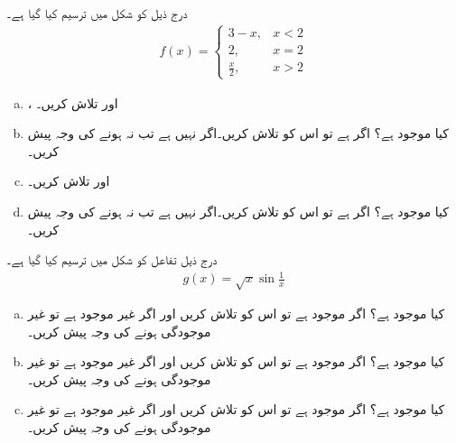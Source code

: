 درج ذیل کو شکل  میں ترسیم کیا گیا ہے۔
\begin{align*}
f(x)=\begin{cases}
3-x,&x<2\\
2,&x=2\\
\frac{x}{2},&x>2
\end{cases}
\end{align*}
%
\begin{enumerate}[a.]
\item
{}،  اور  تلاش کریں۔
\item
کیا  موجود ہے؟ اگر ہے تو اس کو تلاش کریں۔اگر نہیں ہے تب نہ ہونے کی وجہ پیش کریں۔
\item
{} اور  تلاش کریں۔
\item
کیا  موجود ہے؟ اگر ہے تو اس کو تلاش کریں۔اگر نہیں ہے تب نہ ہونے کی وجہ پیش کریں۔
\end{enumerate}
درج ذیل تفاعل کو شکل  میں ترسیم کیا گیا ہے۔
\begin{align*}
g(x)=\sqrt{x}\sin\frac{1}{x}
\end{align*}
%
\begin{enumerate}[a.]
\item
کیا  موجود ہے؟ اگر موجود ہے تو اس کو تلاش کریں اور اگر غیر موجود ہے تو غیر موجودگی ہونے کی وجہ پیش کریں۔
\item
کیا  موجود ہے؟ اگر موجود ہے تو اس کو تلاش کریں اور اگر غیر موجود ہے تو غیر موجودگی ہونے کی وجہ پیش کریں۔
\item
کیا  موجود ہے؟ اگر موجود ہے تو اس کو تلاش کریں اور اگر غیر موجود ہے تو غیر موجودگی ہونے کی وجہ پیش کریں۔
\end{enumerate}
%

